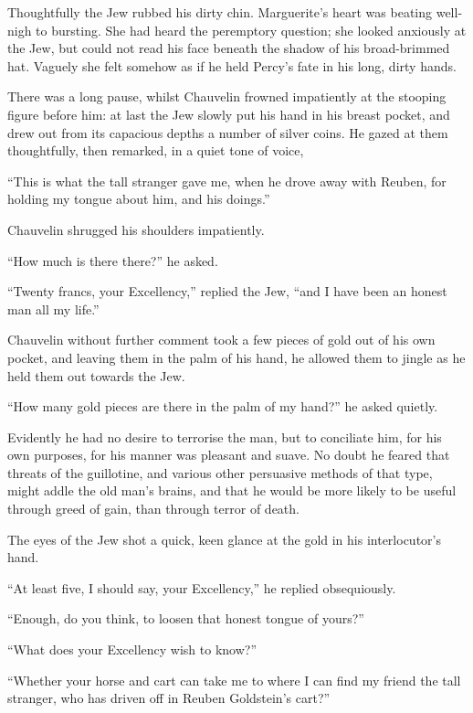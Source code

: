 Thoughtfully the Jew rubbed his dirty chin. Marguerite's heart was beating well-nigh to bursting. She had heard the peremptory question; she looked anxiously at the Jew, but could not read his face beneath the shadow of his broad-brimmed hat. Vaguely she felt somehow as if he held Percy's fate in his long, dirty hands.

There was a long pause, whilst Chauvelin frowned impatiently at the stooping figure before him: at last the Jew slowly put his hand in his breast pocket, and drew out from its capacious depths a number of silver coins. He gazed at them thoughtfully, then remarked, in a quiet tone of voice,\longdash


\enquote{This is what the tall stranger gave me, when he drove away with Reuben, for holding my tongue about him, and his doings.}

Chauvelin shrugged his shoulders impatiently.

\enquote{How much is there there?} he asked.

\enquote{Twenty francs, your Excellency,} replied the Jew, \enquote{and I have been an honest man all my life.}

Chauvelin without further comment took a few pieces of gold out of his own pocket, and leaving them in the palm of his hand, he allowed them to jingle as he held them out towards the Jew.

\enquote{How many gold pieces are there in the palm of my hand?} he asked quietly.

Evidently he had no desire to terrorise the man, but to conciliate him, for his own purposes, for his manner was pleasant and suave. No doubt he feared that threats of the guillotine, and various other persuasive methods of that type, might addle the old man's brains, and that he would be more likely to be useful through greed of gain, than through terror of death.

The eyes of the Jew shot a quick, keen glance at the gold in his interlocutor's hand.

\enquote{At least five, I should say, your Excellency,} he replied obsequiously.

\enquote{Enough, do you think, to loosen that honest tongue of yours?}

\enquote{What does your Excellency wish to know?}

\enquote{Whether your horse and cart can take me to where I can find my friend the tall stranger, who has driven off in Reuben Goldstein's cart?}

